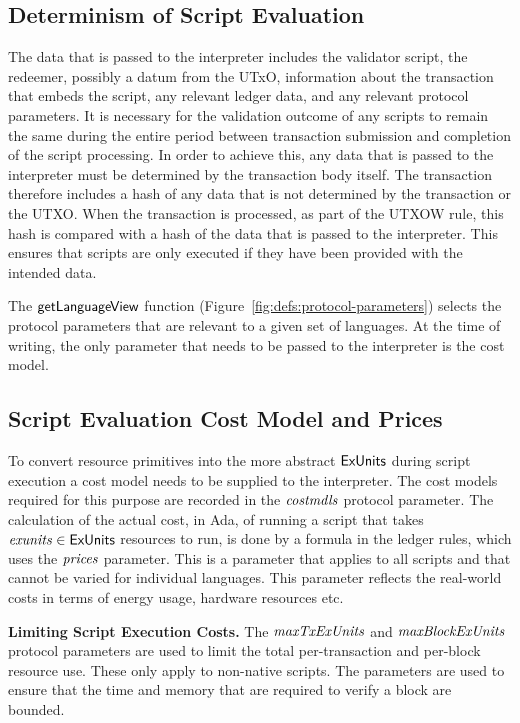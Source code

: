 \subsection{Determinism of Script Evaluation}
\label{sec:determinism}

The data that is passed to the interpreter
includes the validator script, the redeemer, possibly a datum from the UTxO, information about the transaction that
embeds the script, any relevant ledger data, and any relevant protocol parameters.
It is necessary for the validation outcome of any scripts to remain the same during the entire
period between transaction
submission and completion of the script processing.
%
In order to achieve this,
any data that is passed to the interpreter must be determined by the transaction body itself.
The transaction therefore includes a hash of any data that is not determined by the transaction or the UTXO.
When the transaction is processed, as part of the UTXOW rule, this hash is compared with a hash of the data that is passed to the interpreter. This
ensures that scripts are only executed if they have been provided with the intended data.

The $\mathsf{getLanguageView}$ function (Figure~\ref{fig:defs:protocol-parameters}) selects the protocol parameters that are relevant to
a given set of languages.
%
At the time of writing, the only parameter that needs to be passed to the interpreter is the cost model.

\subsection{Script Evaluation Cost Model and Prices}
\label{sec:cost-mod}

To convert resource primitives into the
more abstract $\mathsf{ExUnits}$ during script execution a cost model needs to be supplied to the interpreter.
The cost models required for this purpose are recorded in the $\mathit{costmdls}$ protocol parameter.
%
The calculation of the actual cost, in Ada, of running
a script that takes $\mathit{exunits} \in \mathsf{ExUnits}$ resources to run,
is done by a formula in the ledger rules, which uses the
$\mathit{prices}$ parameter. This is a parameter that applies to all
scripts and that cannot be varied for individual languages. This parameter
reflects the real-world costs in terms of energy usage, hardware resources etc.

\textbf{Limiting Script Execution Costs.}
The $\mathit{maxTxExUnits}$ and $\mathit{maxBlockExUnits}$ protocol parameters are
used to limit the total per-transaction and per-block resource use. These only apply to non-native scripts.
The parameters are used to ensure that the time and memory that are required to verify a block are bounded.

